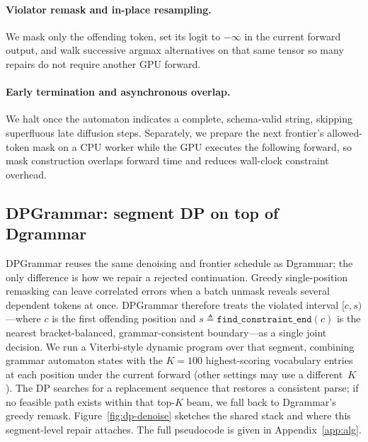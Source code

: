 \paragraph{Violator remask and in-place resampling.}
We mask only the offending token, set its logit to $-\infty$ in the current forward output, and walk successive argmax alternatives on that same tensor so many repairs do not require another GPU forward.

\paragraph{Early termination and asynchronous overlap.}
We halt once the automaton indicates a complete, schema-valid string, skipping superfluous late diffusion steps. Separately, we prepare the next frontier's allowed-token mask on a CPU worker while the GPU executes the following forward, so mask construction overlaps forward time and reduces wall-clock constraint overhead.

\subsection{DPGrammar: segment DP on top of Dgrammar}
\label{sec:dpg}
DPGrammar reuses the same denoising and frontier schedule as Dgrammar; the only difference is how we repair a rejected continuation. Greedy single-position remasking can leave correlated errors when a batch unmask reveals several dependent tokens at once. DPGrammar therefore treats the violated interval $[c,s)$---where $c$ is the first offending position and $s \triangleq \texttt{find\_constraint\_end}(c)$ is the nearest bracket-balanced, grammar-consistent boundary---as a single joint decision. We run a Viterbi-style dynamic program over that segment, combining grammar automaton states with the $K{=}100$ highest-scoring vocabulary entries at each position under the current forward (other settings may use a different~$K$). The DP searches for a replacement sequence that restores a consistent parse; if no feasible path exists within that top-$K$ beam, we fall back to Dgrammar's greedy remask. Figure~\ref{fig:dp-denoise} sketches the shared stack and where this segment-level repair attaches. The full pseudocode is given in Appendix~\ref{app:alg}.

